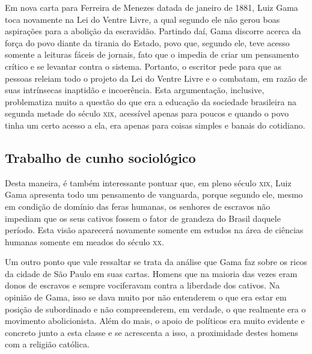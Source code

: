\documentclass[12pt]{extarticle}
\begin{document}




Em nova carta para Ferreira de Menezes datada de janeiro de 1881, Luiz
Gama toca novamente na Lei do Ventre Livre, a qual segundo ele não gerou
boas aspirações para a abolição da escravidão. Partindo daí, Gama
discorre acerca da força do povo diante da tirania do Estado, povo que,
segundo ele, teve acesso somente a leituras fáceis de jornais, fato que
o impedia de criar um pensamento crítico e se levantar contra o sistema.
Portanto, o escritor pede para que as pessoas releiam todo o projeto da
Lei do Ventre Livre e o combatam, em razão de suas intrínsecas inaptidão
e incoerência. Esta argumentação, inclusive, problematiza muito a
questão do que era a educação da sociedade brasileira na segunda metade
do século \textsc{xix}, acessível apenas para poucos e quando o povo tinha um
certo acesso a ela, era apenas para coisas simples e banais do
cotidiano.




\subsection{Trabalho de cunho sociológico}

Desta maneira, é também interessante pontuar que, em pleno século \textsc{xix},
Luiz Gama apresenta todo um pensamento de vanguarda, porque segundo ele,
mesmo em condição de domínio das feras humanas, os senhores de escravos
não impediam que os seus cativos fossem o fator de grandeza do Brasil
daquele período. Esta visão aparecerá novamente somente em estudos na
área de ciências humanas somente em meados do século \textsc{xx}.

Um outro ponto que vale ressaltar se trata da análise que Gama faz sobre
os ricos da cidade de São Paulo em suas cartas. Homens que na maioria
das vezes eram donos de escravos e sempre vociferavam contra a liberdade
dos cativos. Na opinião de Gama, isso se dava muito por não entenderem o
que era estar em posição de subordinado e não compreenderem, em verdade,
o que realmente era o movimento abolicionista. Além do mais, o apoio de
políticos era muito evidente e concreto junto a esta classe e se
acrescenta a isso, a proximidade destes homens com a religião católica.
\end{document}
